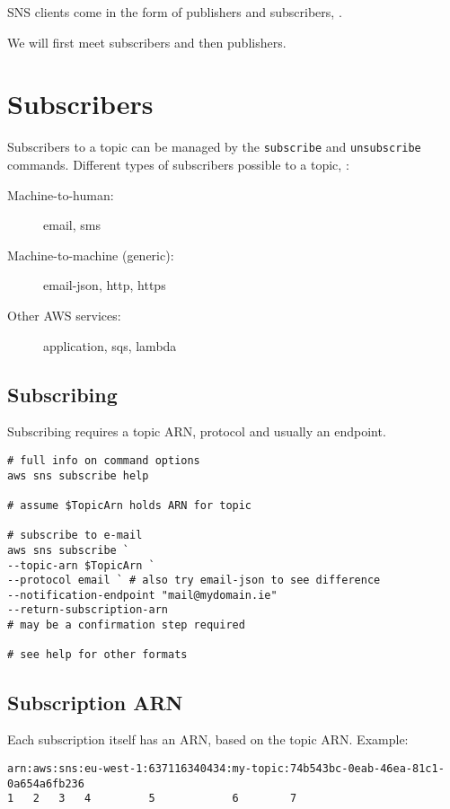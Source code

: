 \documentclass{pgnotes}
\begin{document}
SNS clients come in the form of publishers and subscribers, .

We will first meet subscribers and then publishers.

\section{Subscribers}\label{subscribers}

Subscribers to a topic can be managed by the \texttt{subscribe} and
\texttt{unsubscribe} commands. Different types of subscribers possible
to a topic, :

\begin{description}
\item[Machine-to-human:]
email, sms
\item[Machine-to-machine (generic):]
email-json, http, https
\item[Other AWS services:]
application, sqs, lambda
\end{description}

\subsection{Subscribing}\label{subscribing}

Subscribing requires a topic ARN, protocol and usually an endpoint.

\begin{verbatim}
# full info on command options
aws sns subscribe help

# assume $TopicArn holds ARN for topic

# subscribe to e-mail 
aws sns subscribe `
--topic-arn $TopicArn `
--protocol email ` # also try email-json to see difference
--notification-endpoint "mail@mydomain.ie"
--return-subscription-arn
# may be a confirmation step required

# see help for other formats
\end{verbatim}

\subsection{Subscription ARN}\label{subscription-arn}

Each subscription itself has an ARN, based on the topic ARN. Example:

\begin{verbatim}
arn:aws:sns:eu-west-1:637116340434:my-topic:74b543bc-0eab-46ea-81c1-0a654a6fb236
1   2   3   4         5            6        7
\end{verbatim}
\end{document}

